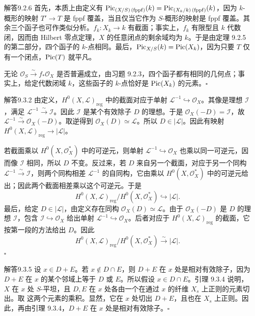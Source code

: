 \begin{origstatement}{解答}{9.2.6}\label{appA:ans926}
首先，本质上由定义有 $\operatorname{Pic}_{(X/S)\,(\mathrm{fppf})}(k)=\operatorname{Pic}_{(X_k/k)\,(\mathrm{fppf})}(k)$，因为 $k$-概形的映射 $T'\to T$ 是 fppf 覆盖，当且仅当它作为 $S$-概形的映射是 fppf 覆盖。其余三个函子也可作类似分析。$f_k\colon X_k\to k$ 有截面；事实上，$f_k$ 有限型且 $k$ 代数闭，因而由 Hilbert 零点定理，$X$ 的任意闭点的剩余域均为 $k$。于是由定理 9.2.5 的第二部分，四个函子的 $k$-点相同。最后，$\operatorname{Pic}_{X/S}(k)=\operatorname{Pic}(X_k)$，因为只要 $T$ 仅有一个闭点，$\operatorname{Pic}(T)$ 就平凡。

无论 $\mathcal O_S\xrightarrow{\sim}f_*\mathcal O_X$ 是否普遍成立，由习题 9.2.3，四个函子都有相同的几何点；事实上，给定代数闭域 $k$，这些函子的 $k$-点恰好是 $\operatorname{Pic}(X_k)$ 的元素。\hfill$\square$
\end{origstatement}

\begin{origstatement}{解答}{9.3.2}\label{appA:ans932}
由定义，$H^0(X,\mathcal L)_{\mathrm{reg}}$ 中的截面对应于单射 $\mathcal L^{-1}\hookrightarrow\mathcal O_X$。其像是理想 $\mathcal I$，满足 $\mathcal L^{-1}\xrightarrow{\sim}\mathcal I$。因此 $\mathcal I$ 是某个有效除子 $D$ 的理想。于是 $\mathcal O_X(-D)=\mathcal I$，故 $\mathcal L^{-1}\xrightarrow{\sim}\mathcal O_X(-D)$。取逆得到 $\mathcal O_X(D)\simeq\mathcal L$。所以 $D\in|\mathcal L|$。因此有映射 $H^0(X,\mathcal L)_{\mathrm{reg}}\to|\mathcal L|$。

若截面乘以 $H^0(X,\mathcal O_X^*)$ 中的可逆元，则单射 $\mathcal L^{-1}\hookrightarrow\mathcal O_X$ 也乘以同一可逆元，因而像 $\mathcal I$ 相同，所以 $D$ 不变。反过来，若 $D$ 来自另一个截面，对应于另一个同构 $\mathcal L^{-1}\xrightarrow{\sim}\mathcal I$，则两个同构相差 $\mathcal L^{-1}$ 的自同构，它由乘以 $H^0(X,\mathcal O_X^*)$ 中的可逆元给出；因此两个截面相差乘以这个可逆元。于是
\[
 H^0(X,\mathcal L)_{\mathrm{reg}}/H^0(X,\mathcal O_X^*)\hookrightarrow|\mathcal L|.
\]
最后，给定 $D\in|\mathcal L|$，由定义存在同构 $\mathcal O_X(D)\simeq\mathcal L$。由于 $\mathcal O_X(-D)$ 是 $D$ 的理想 $\mathcal I$，包含 $\mathcal I\hookrightarrow\mathcal O_X$ 给出单射 $\mathcal L^{-1}\hookrightarrow\mathcal O_X$。后者对应于 $H^0(X,\mathcal L)_{\mathrm{reg}}$ 的截面，它按第一段的方法给出 $D$。因此
\[
 H^0(X,\mathcal L)_{\mathrm{reg}}/H^0(X,\mathcal O_X^*)\xrightarrow{\sim}|\mathcal L|.
\]
\hfill$\square$
\end{origstatement}

\begin{origstatement}{解答}{9.3.5}\label{appA:ans935}
设 $x\in D+E$。若 $x\notin D\cap E$，则 $D+E$ 在 $x$ 处是相对有效除子，因为 $D+E$ 在 $x$ 的某个邻域上等于 $D$ 或 $E$。所以假设 $x\in D\cap E$。引理 9.3.4 说明，$X$ 在 $x$ 处 $S$-平坦，且 $D,E$ 在 $x$ 处各由一个在通过 $x$ 的纤维 $X_s$ 上正则的元素切出。取
这两个元素的乘积。显然，它在 $x$ 处切出 $D+E$，且也在 $X_s$ 上正则。因此，再由引理 9.3.4，$D+E$ 在 $x$ 处是相对有效除子。\hfill$\square$
\end{origstatement}


